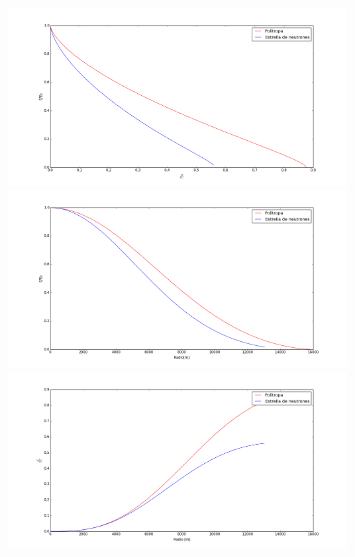 \documentclass[11pt,a4paper]{article}
\begin{document}
\begin{figure}[!ht]
\begin{center}
\includegraphics[width=0.8\textwidth]{pf_1.png}
\includegraphics[width=0.8\textwidth]{pf_2.png}
\includegraphics[width=0.8\textwidth]{pf_3.png}
\end{center}
\end{figure}

\newpage
\end{document}
